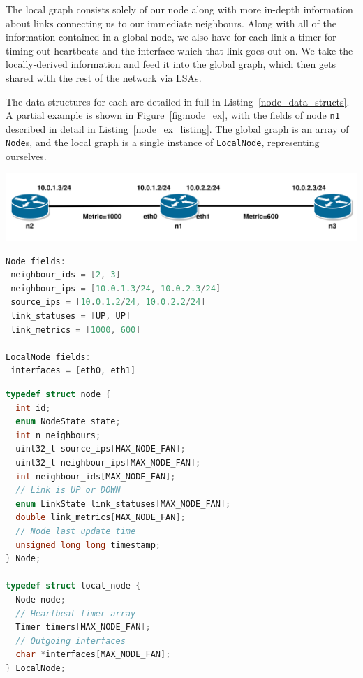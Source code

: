 \documentclass[withindex,glossary,openany]{cam-thesis}
\begin{document}
The local graph consists solely of our node along with more in-depth information about links connecting us to our immediate neighbours. Along with all of the information contained in a global node, we also have for each link a timer for timing out heartbeats and the interface which that link goes out on. We take the locally-derived information and feed it into the global graph, which then gets shared with the rest of the network via LSAs.

The data structures for each are detailed in full in Listing~\ref{node_data_structs}. A partial example is shown in Figure~\ref{fig:node_ex}, with the fields of node \texttt{n1} described in detail in Listing~\ref{node_ex_listing}. The global graph is an array of \texttt{Node}s, and the local graph is a single instance of \texttt{LocalNode}, representing ourselves.

\begin{center}
\begin{minipage}{0.9\textwidth} \centering
	\includegraphics[width=1\textwidth]{node}
	\label{fig:node_ex}
\end{minipage}
\end{center}

\begin{minipage}{1\textwidth} \centering
\begin{lstlisting}[language=C, label=node_ex_listing, frame=tb, columns=fullflexible, caption=Partial example of fields of \texttt{Node} and \texttt{LocalNode}]
Node fields:
 neighbour_ids = [2, 3]
 neighbour_ips = [10.0.1.3/24, 10.0.2.3/24]
 source_ips = [10.0.1.2/24, 10.0.2.2/24]
 link_statuses = [UP, UP]
 link_metrics = [1000, 600]

LocalNode fields:
 interfaces = [eth0, eth1]
\end{lstlisting}
\end{minipage}

\begin{minipage}{1\textwidth} \centering
\begin{lstlisting}[language=C, label=node_data_structs, frame=tb, columns=fullflexible, caption=C source code for \texttt{Node} and \texttt{LocalNode} data structures]
typedef struct node {
  int id;
  enum NodeState state;
  int n_neighbours;
  uint32_t source_ips[MAX_NODE_FAN];
  uint32_t neighbour_ips[MAX_NODE_FAN];
  int neighbour_ids[MAX_NODE_FAN];
  // Link is UP or DOWN
  enum LinkState link_statuses[MAX_NODE_FAN];
  double link_metrics[MAX_NODE_FAN];
  // Node last update time
  unsigned long long timestamp;
} Node;

typedef struct local_node {
  Node node;
  // Heartbeat timer array
  Timer timers[MAX_NODE_FAN];
  // Outgoing interfaces
  char *interfaces[MAX_NODE_FAN];
} LocalNode;
\end{lstlisting}
\end{minipage}
\end{document}
